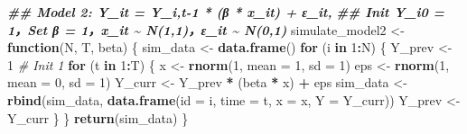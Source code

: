 \documentclass[
]{article}
\newenvironment{Shaded}{\begin{snugshade}}{\end{snugshade}}
\newcommand{\AttributeTok}[1]{\textcolor[rgb]{0.13,0.29,0.53}{#1}}
\newcommand{\CommentTok}[1]{\textcolor[rgb]{0.56,0.35,0.01}{\textit{#1}}}
\newcommand{\ControlFlowTok}[1]{\textcolor[rgb]{0.13,0.29,0.53}{\textbf{#1}}}
\newcommand{\DecValTok}[1]{\textcolor[rgb]{0.00,0.00,0.81}{#1}}
\newcommand{\DocumentationTok}[1]{\textcolor[rgb]{0.56,0.35,0.01}{\textbf{\textit{#1}}}}
\newcommand{\FunctionTok}[1]{\textcolor[rgb]{0.13,0.29,0.53}{\textbf{#1}}}
\newcommand{\NormalTok}[1]{#1}
\newcommand{\OtherTok}[1]{\textcolor[rgb]{0.56,0.35,0.01}{#1}}
\newcommand{\SpecialCharTok}[1]{\textcolor[rgb]{0.81,0.36,0.00}{\textbf{#1}}}
\begin{document}
\begin{Shaded}
\begin{Highlighting}[]
\DocumentationTok{\#\# Model 2: Y\_it = Y\_i,t{-}1 * (β * x\_it) + ε\_it, }
\DocumentationTok{\#\# Init Y\_i0 = 1，Set β = 1，x\_it \textasciitilde{} N(1,1)，ε\_it \textasciitilde{} N(0,1)}
\NormalTok{simulate\_model2 }\OtherTok{\textless{}{-}} \ControlFlowTok{function}\NormalTok{(N, T, beta) \{}
\NormalTok{  sim\_data }\OtherTok{\textless{}{-}} \FunctionTok{data.frame}\NormalTok{()}
  \ControlFlowTok{for}\NormalTok{ (i }\ControlFlowTok{in} \DecValTok{1}\SpecialCharTok{:}\NormalTok{N) \{}
\NormalTok{    Y\_prev }\OtherTok{\textless{}{-}} \DecValTok{1}  \CommentTok{\# Init 1}
    \ControlFlowTok{for}\NormalTok{ (t }\ControlFlowTok{in} \DecValTok{1}\SpecialCharTok{:}\NormalTok{T) \{}
\NormalTok{      x }\OtherTok{\textless{}{-}} \FunctionTok{rnorm}\NormalTok{(}\DecValTok{1}\NormalTok{, }\AttributeTok{mean =} \DecValTok{1}\NormalTok{, }\AttributeTok{sd =} \DecValTok{1}\NormalTok{)}
\NormalTok{      eps }\OtherTok{\textless{}{-}} \FunctionTok{rnorm}\NormalTok{(}\DecValTok{1}\NormalTok{, }\AttributeTok{mean =} \DecValTok{0}\NormalTok{, }\AttributeTok{sd =} \DecValTok{1}\NormalTok{)}
\NormalTok{      Y\_curr }\OtherTok{\textless{}{-}}\NormalTok{ Y\_prev }\SpecialCharTok{*}\NormalTok{ (beta }\SpecialCharTok{*}\NormalTok{ x) }\SpecialCharTok{+}\NormalTok{ eps}
\NormalTok{      sim\_data }\OtherTok{\textless{}{-}} \FunctionTok{rbind}\NormalTok{(sim\_data, }\FunctionTok{data.frame}\NormalTok{(}\AttributeTok{id =}\NormalTok{ i, }\AttributeTok{time =}\NormalTok{ t, }\AttributeTok{x =}\NormalTok{ x, }\AttributeTok{Y =}\NormalTok{ Y\_curr))}
\NormalTok{      Y\_prev }\OtherTok{\textless{}{-}}\NormalTok{ Y\_curr}
\NormalTok{    \}}
\NormalTok{  \}}
  \FunctionTok{return}\NormalTok{(sim\_data)}
\NormalTok{\}}


\end{Highlighting}
\end{Shaded}
\end{document}

